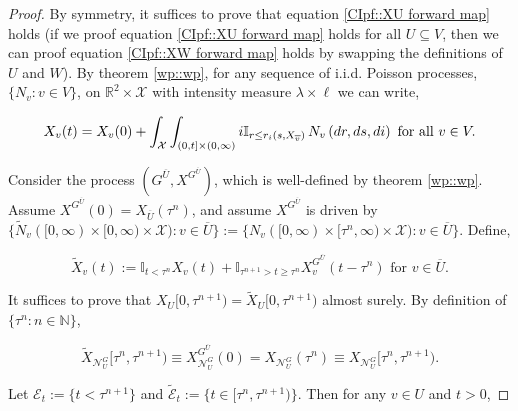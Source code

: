 \documentclass[12pt]{article}
\newcommand{\mb}{\mathbb}
\newcommand{\mc}{\mathcal}
\newcommand{\ov}{\overline}
\newcommand{\te}{\text}
\newcommand{\defeq}{:=}								%
\newcommand{\sta}{\mc{X}}							%
\newcommand{\gneigh}[2]{\mc{N}^{#1}_{#2}}			%
\newcommand{\cl}[1]{\ov{#1}}						%
\newcommand{\indx}[1]{^{#1}}						%
\newcommand{\Xf}{X}									%
\newcommand{\poiss}{N}								%
\newcommand{\leb}{\lambda}							%
\newcommand{\Sm}{\ell}								%
\newcommand{\rate}{r}								%
\newcommand{\poissv}[1]{_{#1}}						%
\newcommand{\vind}[1]{_{#1}}						%
\newcommand{\tme}[1]{(#1)}							%
\newcommand{\tmi}[1]{#1}							%
\newcommand{\gind}[1]{^{#1}}						%
\newcommand{\vpara}[1]{^{#1}}						%
\newcommand{\stpara}[1]{_{#1}}						%
\newcommand{\tpara}[1]{_{#1}}						%
\newcommand{\tmepro}[3]{
\ifstrempty{#3}{
	(#1,#2)}{
	(#1,#2,#3)}}									%
\newcommand{\alt}[1]{\tilde{#1}}					%
\newcommand{\rt}{\tau}								%
\newcommand{\seto}{U}								%
\newcommand{\sett}{W}								%
\newcommand{\evnt}{\mc{E}}						%
\newcommand{\indo}{n}							%
\begin{document}
\begin{proof}
By symmetry, it suffices to prove that equation \ref{CIpf::XU forward map} holds (if we proof equation \eqref{CIpf::XU forward map} holds for all \(\seto \subseteq V\), then we can proof equation \eqref{CIpf::XW forward map} holds by swapping the definitions of \(\seto\) and \(\sett\)). By theorem \ref{wp::wp}, for any sequence of i.i.d. Poisson processes, \(\{\poiss\poissv{v}:v\in V\}\), on \(\mb{R}^2\times \sta\) with intensity measure \(\leb\times\Sm\) we can write,

\[\Xf\vind{v}\tme{t} = \Xf\vind{v}\tme{0} + \int_\sta\int_{(0,t]\times (0,\infty)} i\mb{I}_{r\leq \rate\stpara{i}\tmepro{s}{\Xf\vind{\cl{v}}}{}}\,\poiss\poissv{v}\left(dr,ds,di\right)\te{ for all } v\in V.\]

Consider the process \((G\vpara{\cl{\seto}},\Xf\gind{G\vpara{\cl{\seto}}})\), which is well-defined by theorem \ref{wp::wp}. Assume \(\Xf\gind{G\vpara{\cl{\seto}}}\tme{0} = \Xf\vind{\cl{\seto}}\tme{\rt\indx{\indo}}\), and assume \(\Xf\gind{G\vpara{\cl{\seto}}}\) is driven by \(\{\alt{\poiss}\poissv{v}([0,\infty)\times [0,\infty)\times \sta):v \in \cl{\seto}\} \defeq \{\poiss\poissv{v}([0,\infty)\times [\rt\indx{\indo},\infty)\times \sta):v \in \cl{\seto}\}\). Define,

\[\alt{\Xf}\vind{v}\tme{t} \defeq \mb{I}_{t < \rt\indx{\indo}} \Xf\vind{v}\tme{t} + \mb{I}_{\rt\indx{\indo + 1} > t \geq \rt\indx{\indo}}\Xf\gind{G\vpara{\cl{\seto}}}\vind{v}\tme{t - \rt\indx{\indo}}\te{ for } v \in \cl{\seto}.\]

It suffices to prove that \(\Xf\vind{\seto}\tmi{[0,\rt\indx{\indo+1})} = \alt{\Xf}\vind{\seto}\tmi{[0,\rt\indx{\indo+1})}\) almost surely. By definition of \(\{\rt\indx{\indo}:\indo\in\mb{N}\}\), 

\[\alt{\Xf}\vind{\gneigh{G}{\seto}}\tmi{[\rt\indx{\indo},\rt\indx{\indo+1})} \equiv \Xf\gind{G\vpara{\cl{\seto}}}\vind{\gneigh{G}{\seto}}\tme{0} = \Xf\vind{\gneigh{G}{\seto}}\tme{\rt\indx{\indo}} \equiv \Xf\vind{\gneigh{G}{\seto}}\tmi{[\rt\indx{\indo},\rt\indx{\indo+1})}.\]

Let \(\evnt\tpara{t} \defeq \{t < \rt\indx{\indo+1}\}\) and \(\alt{\evnt}\tpara{t} \defeq \{t \in [\rt\indx{\indo},\rt\indx{\indo+1})\}\). Then for any \(v \in \seto\) and \(t > 0\),


\end{proof}
\end{document}
